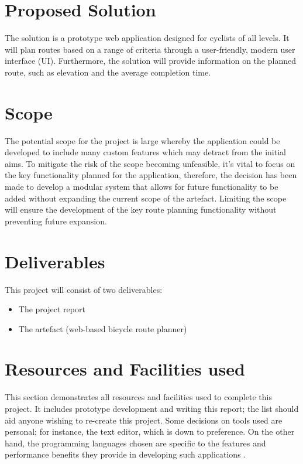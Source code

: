 \section{Proposed Solution}
\label{intro:proposedsolution}

The solution is a prototype web application designed for cyclists of all levels. It will plan routes based on a range of criteria through a user-friendly, modern user interface (UI). Furthermore, the solution will provide information on the planned route, such as elevation and the average completion time.

\section{Scope}
\label{intro:scope}

The potential scope for the project is large whereby the application could be developed to include many custom features which may detract from the initial aims. To mitigate the risk of the scope becoming unfeasible, it's vital to focus on the key functionality planned for the application, therefore, the decision has been made to develop a modular system that allows for future functionality to be added without expanding the current scope of the artefact. Limiting the scope will ensure the development of the key route planning functionality without preventing future expansion.

\section{Deliverables}
\label{intro:deliverables}

This project will consist of two deliverables:
\begin{itemize}
    \item The project report
    \item The artefact (web-based bicycle route planner)
\end{itemize}

\section{Resources and Facilities used}
\label{intro:resourcesandfacilities}

This section demonstrates all resources and facilities used to complete this project. It includes prototype development and writing this report; the list should aid anyone wishing to re-create this project. Some decisions on tools used are personal; for instance, the text editor, which is down to preference. On the other hand, the programming languages chosen are specific to the features and performance benefits they provide in developing such applications .


